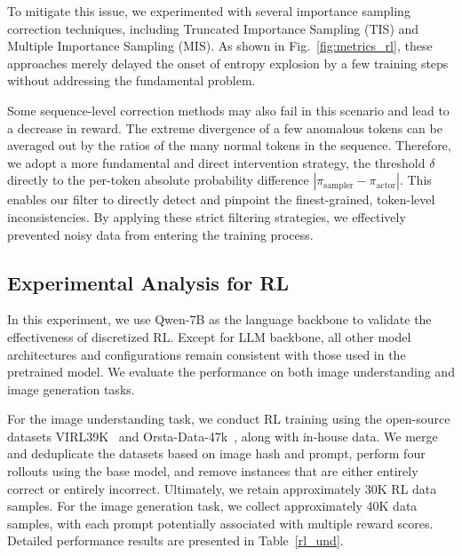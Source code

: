To mitigate this issue, we experimented with several importance sampling correction techniques, including Truncated Importance Sampling (TIS)\cite{yao2025offpolicy} and Multiple Importance Sampling (MIS)\cite{liu2025speed}. As shown in Fig.~\ref{fig:metrics_rl}, these approaches merely delayed the onset of entropy explosion by a few training steps without addressing the fundamental problem. 

Some sequence-level correction methods\cite{liu-li-2025-rl-collapse} may also fail in this scenario and lead to a decrease in reward. The extreme divergence of a few anomalous tokens can be averaged out by the ratios of the many normal tokens in the sequence. 
Therefore, we adopt a more fundamental and direct intervention strategy, the threshold $\delta$ directly to the per-token absolute probability difference $|\pi_{\text{sampler}} - \pi_{\text{actor}}|$. This enables our filter to directly detect and pinpoint the finest-grained, token-level inconsistencies. By applying these strict filtering strategies, we effectively prevented noisy data from entering the training process.

\subsection{Experimental Analysis for RL}
\label{rl_exp}
In this experiment, we use Qwen-7B as the language backbone to validate the effectiveness of discretized RL. Except for LLM backbone, all other model architectures and configurations remain consistent with those used in the pretrained model. 
We evaluate the performance on both image understanding and image generation tasks. 

For the image understanding task, we conduct RL training using the open-source datasets VIRL39K~\cite{DBLP:journals/corr/abs-2504-08837} and Orsta-Data-47k~\cite{ma2025one}, along with in-house data. 
We merge and deduplicate the datasets based on image hash and prompt, perform four rollouts using the base model, and remove instances that are either entirely correct or entirely incorrect. Ultimately, we retain approximately 30K RL data samples. 
For the image generation task, we collect approximately 40K data samples, with each prompt potentially associated with multiple reward scores. 
Detailed performance results are presented in Table~\ref{rl_und}.

